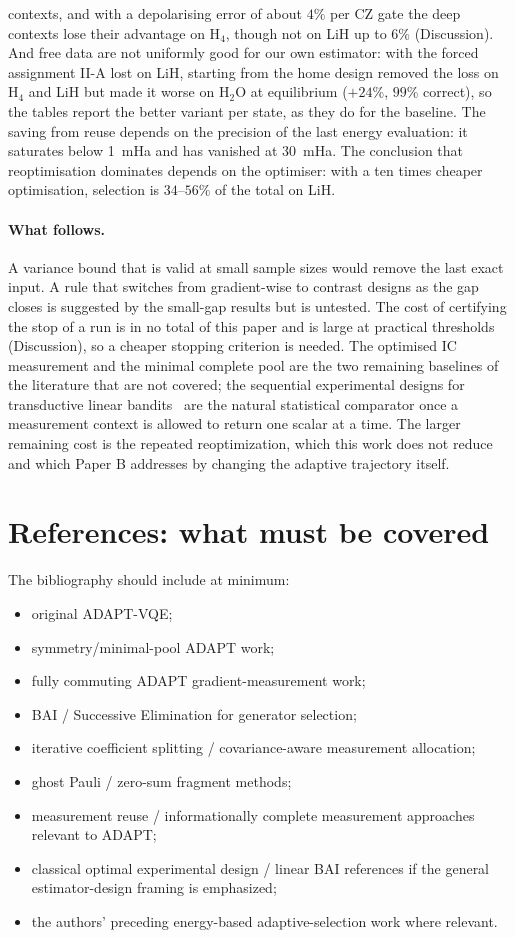\documentclass[aps,pra,reprint,superscriptaddress,nofootinbib]{revtex4-2}
\begin{document}
contexts, and with a depolarising error of about $4\%$ per CZ gate the deep contexts lose their advantage on H$_4$, though not on LiH up to $6\%$ (Discussion). And free data are not uniformly good for our own estimator: with the forced assignment II-A lost on LiH, starting from the home design removed the loss on H$_4$ and LiH but made it worse on H$_2$O at equilibrium ($+24\%$, $99\%$ correct), so the tables report the better variant per state, as they do for the baseline. The saving from reuse depends on the precision of the last energy evaluation: it saturates below 1~mHa and has vanished at 30~mHa. The conclusion that reoptimisation dominates depends on the optimiser: with a ten times cheaper optimisation, selection is $34$--$56\%$ of the total on LiH.

\paragraph{What follows.} A variance bound that is valid at small sample sizes would remove the last exact input. A rule that switches from gradient-wise to contrast designs as the gap closes is suggested by the small-gap results but is untested. The cost of certifying the stop of a run is in no total of this paper and is large at practical thresholds (Discussion), so a cheaper stopping criterion is needed. The optimised IC measurement and the minimal complete pool are the two remaining baselines of the literature that are not covered; the sequential experimental designs for transductive linear bandits~\cite{soare2014,fiez2019} are the natural statistical comparator once a measurement context is allowed to return one scalar at a time. The larger remaining cost is the repeated reoptimization, which this work does not reduce and which Paper B addresses by changing the adaptive trajectory itself.

\section{References: what must be covered}

The bibliography should include at minimum:
\begin{itemize}[leftmargin=2em]
\item original ADAPT-VQE;
\item symmetry/minimal-pool ADAPT work;
\item fully commuting ADAPT gradient-measurement work;
\item BAI / Successive Elimination for generator selection;
\item iterative coefficient splitting / covariance-aware measurement allocation;
\item ghost Pauli / zero-sum fragment methods;
\item measurement reuse / informationally complete measurement approaches relevant to ADAPT;
\item classical optimal experimental design / linear BAI references if the general estimator-design framing is emphasized;
\item the authors' preceding energy-based adaptive-selection work where relevant.
\end{itemize}
\end{document}
